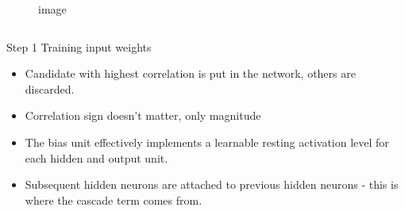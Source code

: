 \documentclass[presentation]{beamer}
\begin{document}
\begin{frame}
\begin{columns}[t]
\begin{column}{0.5\textwidth}
\begin{figure}
        \caption{image}
      \end{figure}			
		\end{column}
	\end{columns}
\end{frame}



\begin{frame}{Step 1 Training input weights}
  \begin{itemize}
    \item Candidate with highest correlation is put in the network, others are discarded.
    \item Correlation sign doesn't matter, only magnitude
    \item The bias unit effectively implements a learnable resting activation level for each hidden and output unit.
    \item Subsequent hidden neurons are attached to previous hidden neurons - this is where the cascade term comes from.
  \end{itemize}
\end{frame}
\end{document}
